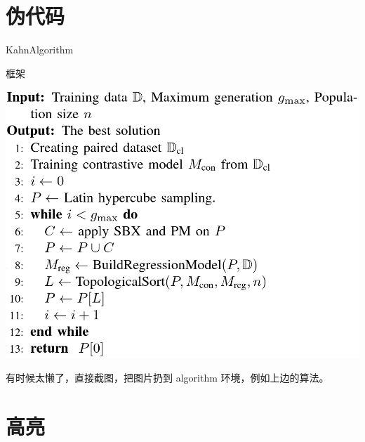 \documentclass[UTF8]{ctexrep}
\begin{document}
\section{伪代码}
\begin{center}
    \begin{minipage}{0.55\textwidth}
        \begin{algorithm}[H]
            \centering
            \caption{KahnAlgorithm}
            \label{algo:kaha}
            
        \end{algorithm}
    \end{minipage}
\end{center}

\begin{center}
    \begin{minipage}{0.55\textwidth}
        \begin{algorithm}[H]
            \scriptsize
            \caption{框架}
            \label{aglo:figure}
            \includegraphics[width=\textwidth]{./algo/figure.png}
        \end{algorithm}
    \end{minipage}
\end{center}
有时候太懒了，直接截图，把图片扔到 algorithm 环境，例如上边的算法。

\section{高亮}

\inputminted[linenos]{cpp}{./code/quicksort.cpp}
\end{document}
